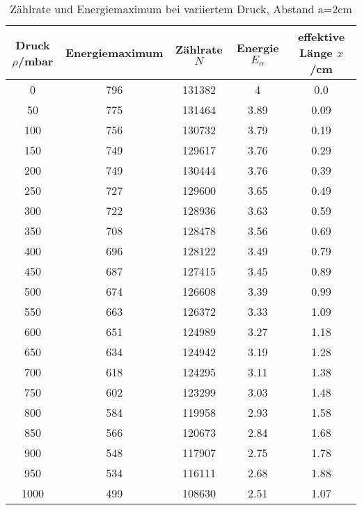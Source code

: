 \begin{table}[H]
  \centering
  \caption{Zählrate und Energiemaximum bei variiertem Druck, Abstand a=2cm}
  \label{tab:tab2}
    \begin{tabular}{c c c c c}
    \toprule
    Druck $\rho$/\;mbar & Energiemaximum & Zählrate $N$ & Energie $E_{\alpha}$ & effektive Länge $x$/\;cm\\
    \midrule
    0 & 796 &131382  &4          & 0.0   \\
    50 & 775 &131464 &3.89 & 0.09 \\
    100 &756 &130732 &3.79 & 0.19\\
    150 &749 &129617 &3.76  &  0.29\\
    200 &749 &130444 &3.76  & 0.39\\
    250 &727 &129600 &3.65 & 0.49\\
    300 &722 &128936 &3.63 & 0.59\\
    350 &708 &128478 &3.56 & 0.69\\
    400 &696 &128122 &3.49 & 0.79\\
    450 &687 &127415 &3.45 & 0.89\\
    500 &674 &126608 &3.39 & 0.99\\
    550 &663 &126372 &3.33 &1.09\\
    600 &651 &124989 &3.27 & 1.18\\
    650 &634 &124942 &3.19 & 1.28\\
    700 &618 &124295 &3.11 &1.38\\
    750 &602 &123299 &3.03 & 1.48\\
    800 &584 &119958 &2.93 &1.58\\
    850 &566 &120673 &2.84 &1.68\\
    900 &548 &117907 &2.75 & 1.78\\
    950 &534 &116111 &2.68&   1.88\\
    1000 &499& 108630&2.51 & 1.07\\
    \bottomrule
    \end{tabular}
  \end{table}
